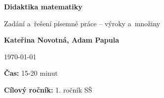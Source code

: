 \documentclass[12pt,a4paper,addpoints]{exam}
\def\maintitle{Didaktika matematiky}
\def\subtitle{Zadání a~řešení písemné práce -- výroky a~množiny}
\def\authorname{Kateřina Novotná, Adam Papula}
\begin{document}
    \begin{titlepage}
        \begin{center}
            \Large\textbf{{\maintitle}}

            \normalsize
            \vspace{0.5cm}
                \subtitle
            \vspace{1.5cm}
            
            \textbf{\authorname}
            \vspace{1.5cm}

            \today
            \vfill
            
            \raggedright
                \textbf{Čas:} 15-20 minut

                \textbf{Cílový ročník:} 1. ročník SŠ
                

\end{center}
\end{titlepage}
\end{document}
